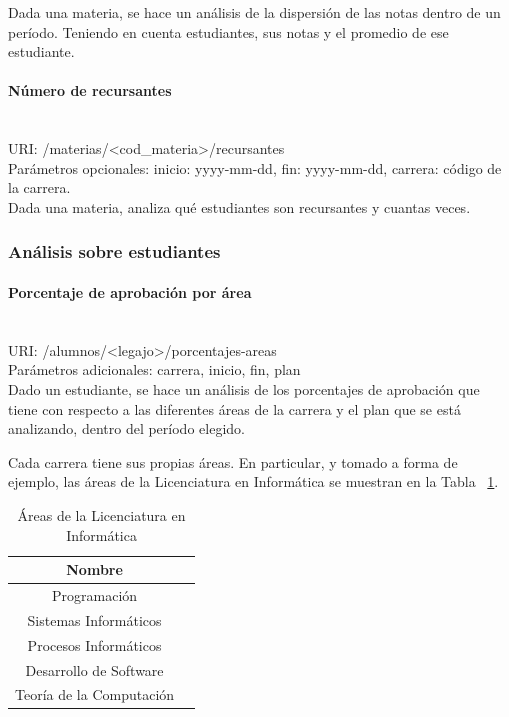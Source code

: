 Dada una materia, se hace un análisis de la dispersión de las notas dentro de un período. Teniendo en cuenta estudiantes, sus notas y el promedio de ese estudiante.

\paragraph{Número de recursantes}\mbox{}\\

URI: /materias/<cod\_materia>/recursantes \\

Parámetros opcionales: inicio: yyyy-mm-dd, fin: yyyy-mm-dd, carrera: código de la carrera. \\

Dada una materia, analiza qué estudiantes son recursantes y cuantas veces.


\subsubsection{Análisis sobre estudiantes}

\paragraph{Porcentaje de aprobación por área}\mbox{}\\

URI: /alumnos/<legajo>/porcentajes-areas \\

Parámetros adicionales: carrera, inicio, fin, plan \\

Dado un estudiante, se hace un análisis de los porcentajes de aprobación que tiene con respecto a las diferentes áreas de la carrera y el plan que se está analizando, dentro del período elegido.

Cada carrera tiene sus propias áreas. En particular, y tomado a forma de ejemplo, las áreas de la Licenciatura en Informática se muestran en la Tabla ~\ref{tab:tabla_areas}.

\begin{table}[!htbp]
    \centering
    \makegapedcells
    \begin{tabular}{|c|c|}
    \hline
    Nombre \\ \hline
    Programación \\ \hline
    Sistemas Informáticos \\ \hline
    Procesos Informáticos\\ \hline
    Desarrollo de Software \\ \hline
    Teoría de la Computación \\ \hline
    \end{tabular}
    \caption{Áreas de la Licenciatura en Informática}
    \label{tab:tabla_areas}
\end{table}

